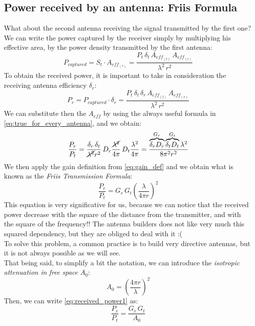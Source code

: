 \subsection*{Power received by an antenna: Friis Formula}
What about the second antenna receiving the signal transmitted by the first one? We can write the power captured by the receiver simply by multiplying his effective area, by the power density transmitted by the first antenna:
\begin{equation}\label{eq:pow_captured}
    P_{captured}=S_t\cdot A_{eff_{(r)}}=\frac{P_t\,\delta_t\,A_{eff_{(t)}}\,A_{eff_{(r)}}}{\lambda^2\,r^2}
\end{equation}
To obtain the received power, it is important to take in consideration the receiving antenna efficiency $\delta_r$:
\begin{equation}
    P_r=P_{captured}\cdot \delta_r=\frac{P_t\,\delta_t\,\delta_r\,A_{eff_{(t)}}\,A_{eff_{(r)}}}{\lambda^2\,r^2}
\end{equation}
We can substitute then the $A_{eff}$ by using the always useful formula in \cref{eq:true_for_every_antenna}, and we obtain:
\begin{equation}
    \frac{P_r}{P_t}=\frac{\delta_r\,\delta_t}{\cancel{\lambda^2}r^2}\,D_r\frac{\cancel{\lambda^2}}{4\pi}\,D_t\frac{\lambda^2}{4\pi}=\frac{\overbrace{\delta_rD_r}^{G_r}\overbrace{\delta_tD_t}^{G_t}\lambda^2}{8\pi^2r^2}
\end{equation}
We then apply the gain definition from \cref{eq:gain_def} and we obtain what is known as the \emph{Friis Transmission Formula}:
\begin{equation}\label{eq:received_power1}
    \frac{P_r}{P_t}=G_r\,G_t\left(\frac{\lambda}{4\pi r}\right)^2
\end{equation}
This equation is very significative for us, because we can notice that the received power decrease with the square of the distance from the transmitter, and with the square of the frequency!! The antenna builders does not like very much this squared dependency, but they are obliged to deal with it :(\\
To solve this problem, a common practice is to build very directive antennas, but it is not always possible as we will see.\\
That being said, to simplify a bit the notation, we can introduce the \emph{isotropic attenuation in free space} $A_0$:
\begin{equation}\label{eq:isotropic_attenuation}
    A_0=\left(\frac{4\pi r}{\lambda}\right)^2
\end{equation}
Then, we can write \cref{eq:received_power1} as:
\begin{equation}\label{eq:received_power2}
    \frac{P_r}{P_t}=\frac{G_r\,G_t}{A_0}
\end{equation}
